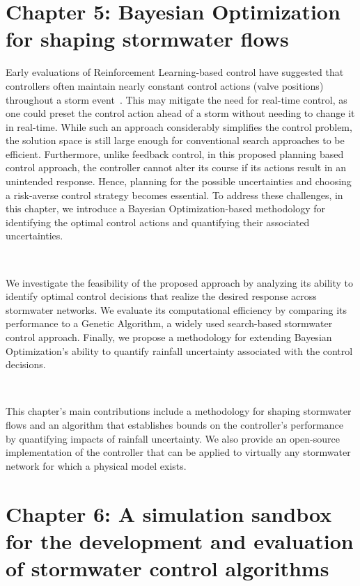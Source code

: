 \section{Chapter 5: Bayesian Optimization for shaping stormwater flows}

Early evaluations of Reinforcement Learning-based control have suggested that controllers often maintain nearly constant control actions (valve positions) throughout a storm event~\cite{Mullapudi_Lewis_Gruden_Kerkez_2020}.
This may mitigate the need for real-time control, as one could preset the control action ahead of a storm without needing to change it in real-time. 
While such an approach considerably simplifies the control problem, the solution space is still large enough for conventional search approaches to be efficient.
Furthermore, unlike feedback control, in this proposed planning based control approach, the controller cannot alter its course if its actions result in an unintended response. 
Hence, planning for the possible uncertainties and choosing a risk-averse control strategy becomes essential.
To address these challenges, in this chapter, we introduce a Bayesian Optimization-based methodology for identifying the optimal control actions and quantifying their associated uncertainties.

\

We investigate the feasibility of the proposed approach by analyzing its ability to identify optimal control decisions that realize the desired response across stormwater networks.
We evaluate its computational efficiency by comparing its performance to a Genetic Algorithm, a widely used search-based stormwater control approach.
Finally, we propose a methodology for extending Bayesian Optimization's ability to quantify rainfall uncertainty associated with the control decisions.

\

This chapter's main contributions include a methodology for shaping stormwater flows and an algorithm that establishes bounds on the controller's performance by quantifying impacts of rainfall uncertainty.
We also provide an open-source implementation of the controller that can be applied to virtually any stormwater network for which a physical model exists.

\section{Chapter 6: A simulation sandbox for the development and evaluation of stormwater control algorithms}

